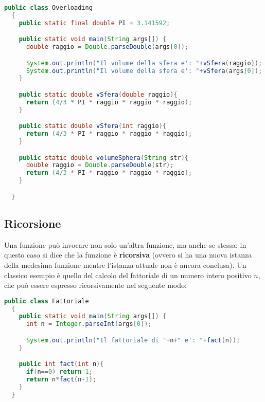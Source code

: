 \documentclass[a4paper]{extarticle}
\begin{document}
\vspace{1em}
\noindent
\begin{lstlisting}[language=Java, caption=Overloading in Java]
  public class Overloading
  {
    public static final double PI = 3.141592;

    public static void main(String args[]) {
      double raggio = Double.parseDouble(args[0]);

      System.out.println("Il volume della sfera e': "+vSfera(raggio));
      System.out.println("Il volume della sfera e': "+vSfera(args[0]);
    }

    public static double vSfera(double raggio){
      return (4/3 * PI * raggio * raggio * raggio);
    }

    public static double vSfera(int raggio){
      return (4/3 * PI * raggio * raggio * raggio);
    }

    public static double volumeSphera(String str){
      double raggio = Double.parseDouble(str);
      return (4/3 * PI * raggio * raggio * raggio);
    }

  }
\end{lstlisting}

\vspace{1em}
\subsection{Ricorsione}
Una funzione può invocare non solo un’altra funzione, ma anche se stessa: in questo caso si dice che la funzione è \textbf{ricorsiva} (ovvero si ha una nuova istanza della medesima funzione mentre l’istanza attuale non è ancora conclusa).
Un classico esempio è quello del calcolo del fattoriale di un numero intero positivo $n$, che può essere espresso ricorsivamente nel seguente modo:

\newpage
\noindent
\begin{lstlisting}[language=Java, caption=Funzione ricorsiva in Java]
  public class Fattoriale
  {
    public static void main(String args[]) {
      int n = Integer.parseInt(args[0]);

      System.out.println("Il fattoriale di "+n+" e': "+fact(n));
    }

    public int fact(int n){
      if(n==0) return 1;
      return n*fact(n-1);
    }
  }
\end{lstlisting}
\end{document}
